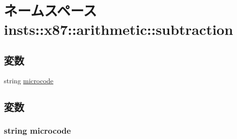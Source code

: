\hypertarget{namespaceinsts_1_1x87_1_1arithmetic_1_1subtraction}{
\section{ネームスペース insts::x87::arithmetic::subtraction}
\label{namespaceinsts_1_1x87_1_1arithmetic_1_1subtraction}
}
\subsection*{変数}
\begin{DoxyCompactItemize}
\item 
string \hyperlink{namespaceinsts_1_1x87_1_1arithmetic_1_1subtraction_a770f11a173e99389a8802f0107ed8f52}{microcode}
\end{DoxyCompactItemize}


\subsection{変数}
\hypertarget{namespaceinsts_1_1x87_1_1arithmetic_1_1subtraction_a770f11a173e99389a8802f0107ed8f52}{
\subsubsection[{microcode}]{\setlength{\rightskip}{0pt plus 5cm}string {\bf microcode}}}
\label{namespaceinsts_1_1x87_1_1arithmetic_1_1subtraction_a770f11a173e99389a8802f0107ed8f52}
